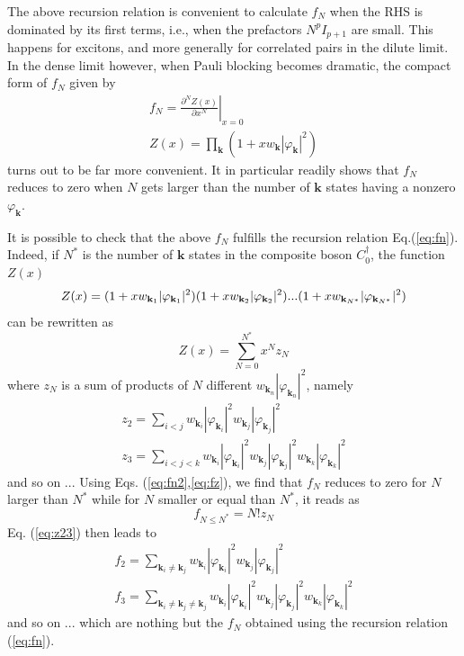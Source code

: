 \documentclass[aps,prb,preprint,groupedaddress,amsmath]{revtex4}
\newcommand{\vk}{\ensuremath{\mathbf{k}}}
\newcommand{\dg}{\ensuremath{\dagger}}
\begin{document}
The above recursion relation is convenient to calculate $f_N$ when the RHS is dominated by its first terms, i.e., when the prefactors $N^pI_{p+1}$ are small.  This happens for excitons,  and more generally for correlated pairs in the dilute limit.  In the dense limit however, when Pauli blocking becomes dramatic, the compact form of  $f_N$   given by 
\begin{equation}\label{eq:fn2}
\begin{split}
f_N=\left.\frac{\partial^NZ(x)}{\partial{x^N}}\right|_{x=0}\\
Z(x)=\prod_\vk(1+xw_\vk|\varphi_\vk|^2)
\end{split}
\end{equation}
turns out to be far more convenient. It in particular readily shows that $f_N$ reduces to zero when $N$ gets larger than the number of $\vk$ states having a nonzero $\varphi_\vk$. 

It is possible to check that the above $f_N$ fulfills the recursion relation Eq.(\ref{eq:fn}). Indeed, if $N^*$ is the number of $\vk$ states in the composite boson $C_0^\dg$, the function $Z(x)$
\begin{equation}
Z(x)=(1+xw_{\vk_1}|\varphi_{\vk_1}|^2)(1+xw_{\vk_2}|\varphi_{\vk_2}|^2)...(1+xw_{\vk_{N^*}}|\varphi_{\vk_{N^*}}|^2)\\
\end{equation}
can be rewritten as
\begin{equation}\label{eq:fz}
Z(x)= \sum_{N=0}^{N^*}x^Nz_N
\end{equation}
where $z_N$ is a sum of products of $N$ different $w_{\vk_n}|\varphi_{\vk_n}|^2$, namely
\begin{equation}\label{eq:z23}
\begin{split}
z_2= \sum_{i<j}w_{\vk_i}|\varphi_{\vk_i}|^2w_{\vk_j}|\varphi_{\vk_j}|^2\\
z_3= \sum_{i<j<k}w_{\vk_i}|\varphi_{\vk_i}|^2w_{\vk_j}|\varphi_{\vk_j}|^2w_{\vk_k}|\varphi_{\vk_k}|^2
\end{split}
\end{equation}
and so on ... Using Eqs. (\ref{eq:fn2},\ref{eq:fz}), we find that $f_N$ reduces to zero for $N$ larger than $N^*$ while for $N$ smaller or equal  than  $N^*$, it reads as
\begin{equation}
f_{N\le{}N^*}=N!z_N
\end{equation}
Eq. (\ref{eq:z23}) then leads to
\begin{equation}\label{eq:f23}
\begin{split}
f_2= \sum_{\vk_i\neq\vk_j}w_{\vk_i}|\varphi_{\vk_i}|^2w_{\vk_j}|\varphi_{\vk_j}|^2\\
f_3= \sum_{\vk_i\neq\vk_j\neq\vk_j}w_{\vk_i}|\varphi_{\vk_i}|^2w_{\vk_j}|\varphi_{\vk_j}|^2w_{\vk_k}|\varphi_{\vk_k}|^2
\end{split}
\end{equation}
and so on ... which are nothing but the $f_N$ obtained using the recursion relation (\ref{eq:fn}).
\end{document}
